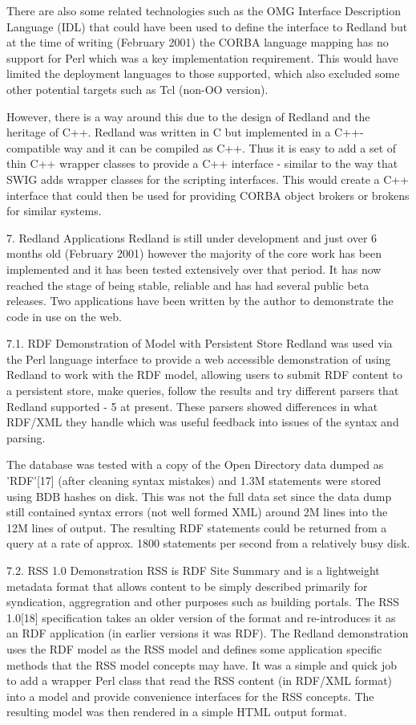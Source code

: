 \documentclass[11pt]{article}
\begin{document}
    There are also some related technologies such as the OMG Interface Description Language (IDL) that could have been used to define the interface to Redland but at the time of writing (February 2001) the CORBA language mapping has no support for Perl which was a key implementation requirement. This would have limited the deployment languages to those supported, which also excluded some other potential targets such as Tcl (non-OO version).

    However, there is a way around this due to the design of Redland and the heritage of C++. Redland was written in C but implemented in a C++-compatible way and it can be compiled as C++. Thus it is easy to add a set of thin C++ wrapper classes to provide a C++ interface - similar to the way that SWIG adds wrapper classes for the scripting interfaces. This would create a C++ interface that could then be used for providing CORBA object brokers or brokens for similar systems.

    7. Redland Applications
    Redland is still under development and just over 6 months old (February 2001) however the majority of the core work has been implemented and it has been tested extensively over that period. It has now reached the stage of being stable, reliable and has had several public beta releases. Two applications have been written by the author to demonstrate the code in use on the web.

    7.1. RDF Demonstration of Model with Persistent Store
    Redland was used via the Perl language interface to provide a web accessible demonstration of using Redland to work with the RDF model, allowing users to submit RDF content to a persistent store, make queries, follow the results and try different parsers that Redland supported - 5 at present. These parsers showed differences in what RDF/XML they handle which was useful feedback into issues of the syntax and parsing.

    The database was tested with a copy of the Open Directory data dumped as 'RDF'[17] (after cleaning syntax mistakes) and 1.3M statements were stored using BDB hashes on disk. This was not the full data set since the data dump still contained syntax errors (not well formed XML) around 2M lines into the 12M lines of output. The resulting RDF statements could be returned from a query at a rate of approx. 1800 statements per second from a relatively busy disk.

    7.2. RSS 1.0 Demonstration
    RSS is RDF Site Summary and is a lightweight metadata format that allows content to be simply described primarily for syndication, aggregration and other purposes such as building portals. The RSS 1.0[18] specification takes an older version of the format and re-introduces it as an RDF application (in earlier versions it was RDF). The Redland demonstration uses the RDF model as the RSS model and defines some application specific methods that the RSS model concepts may have. It was a simple and quick job to add a wrapper Perl class that read the RSS content (in RDF/XML format) into a model and provide convenience interfaces for the RSS concepts. The resulting model was then rendered in a simple HTML output format.
\end{document}
